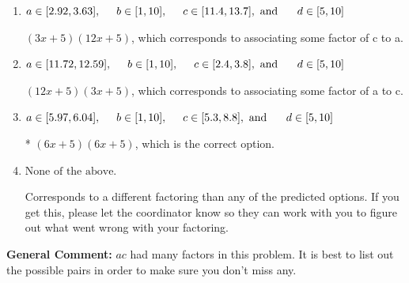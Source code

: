 \documentclass{extbook}[14pt]
\begin{document}
\begin{enumerate}
{\begin{enumerate}[label=\Alph*.]
 $(x + 30)(x + 30)$, which corresponds to factoring $x^{2} +60 x + 900$.
\item \( a \in [2.92, 3.63], \hspace*{5mm} b \in [1, 10], \hspace*{5mm} c \in [11.4, 13.7], \text{ and } \hspace*{5mm} d \in [5, 10] \)

 $(3x + 5)(12x + 5)$, which corresponds to associating some factor of c to a.
\item \( a \in [11.72, 12.59], \hspace*{5mm} b \in [1, 10], \hspace*{5mm} c \in [2.4, 3.8], \text{ and } \hspace*{5mm} d \in [5, 10] \)

 $(12x + 5)(3x + 5)$, which corresponds to associating some factor of a to c.
\item \( a \in [5.97, 6.04], \hspace*{5mm} b \in [1, 10], \hspace*{5mm} c \in [5.3, 8.8], \text{ and } \hspace*{5mm} d \in [5, 10] \)

* $(6x + 5)(6x + 5)$, which is the correct option.
\item \( \text{None of the above.} \)

 Corresponds to a different factoring than any of the predicted options. If you get this, please let the coordinator know so they can work with you to figure out what went wrong with your factoring.
\end{enumerate}

\textbf{General Comment:} $ac$ had many factors in this problem. It is best to list out the possible pairs in order to make sure you don't miss any.
}
\end{enumerate}
\end{document}

